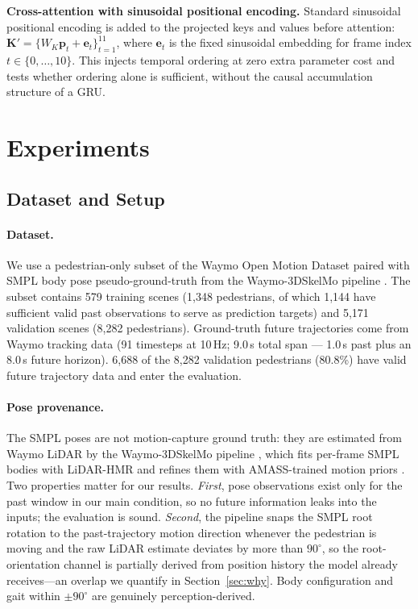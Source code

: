 \documentclass{article} %
\begin{document}
\textbf{Cross-attention with sinusoidal positional encoding.} Standard sinusoidal positional encoding
\citep{vaswani2017attention} is added to the projected keys and values before attention:
$\mathbf{K}' = \{W_K \mathbf{p}_t + \mathbf{e}_t\}_{t=1}^{11}$, where $\mathbf{e}_t$ is
the fixed sinusoidal embedding for frame index $t \in \{0, \ldots, 10\}$.
This injects temporal ordering at zero extra parameter cost and tests whether
ordering alone is sufficient, without the causal accumulation structure of a GRU.

\section{Experiments}
\label{sec:experiments}

\subsection{Dataset and Setup}
\label{sec:setup}

\paragraph{Dataset.}
We use a pedestrian-only subset of the Waymo Open Motion Dataset
\citep{ettinger2021waymo} paired with SMPL body pose pseudo-ground-truth from the
Waymo-3DSkelMo pipeline \citep{zhu2025waymo3dskelmo}. The subset contains 579
training scenes (1{,}348 pedestrians, of which 1{,}144 have sufficient valid past
observations to serve as prediction targets) and 5{,}171 validation scenes
(8{,}282 pedestrians). Ground-truth future trajectories come from Waymo tracking
data (91 timesteps at 10\,Hz; 9.0\,s total span --- 1.0\,s past plus an 8.0\,s
future horizon). 6{,}688 of the 8{,}282 validation
pedestrians (80.8\%) have valid future trajectory data and enter the evaluation.

\paragraph{Pose provenance.}
The SMPL poses are not motion-capture ground truth: they are estimated from Waymo
LiDAR by the Waymo-3DSkelMo pipeline \citep{zhu2025waymo3dskelmo}, which fits
per-frame SMPL bodies with LiDAR-HMR \citep{fan2023lidarhmr} and refines them with
AMASS-trained motion priors \citep{mahmood2019amass,rempe2021humor,he2022nemf}. Two
properties matter for our results. \emph{First}, pose observations exist only for the
past window in our main condition, so no future information leaks into the inputs; the
evaluation is sound. \emph{Second}, the pipeline snaps the SMPL root rotation to the
past-trajectory motion direction whenever the pedestrian is moving and the raw LiDAR
estimate deviates by more than $90^{\circ}$, so the root-orientation channel is
partially derived from position history the model already receives---an overlap we
quantify in Section~\ref{sec:why}. Body configuration and gait within
$\pm 90^{\circ}$ are genuinely perception-derived.
\end{document}
